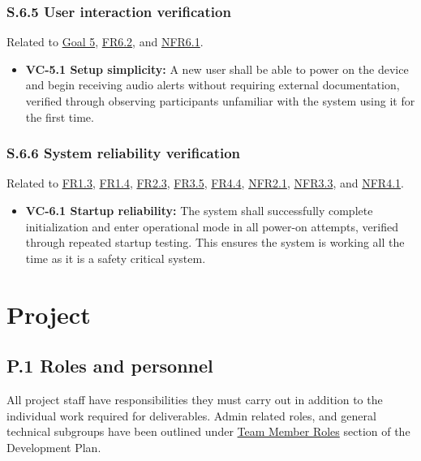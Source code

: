 \documentclass[12pt]{article}
\theoremstyle{definition}
\begin{document}
\subsubsection{S.6.5 User interaction verification}

Related to \hyperref[goal:user_friendly_interaction]{Goal 5},
\hyperref[FR6_2]{FR6.2}, and \hyperref[NFR6_1]{NFR6.1}.

\begin{itemize}
\item \textbf{VC-5.1 Setup simplicity:} A new user shall be able to power on the
device and begin receiving audio alerts without requiring external
documentation, verified through observing participants unfamiliar
with the system using it for the first time.

\end{itemize}

\subsubsection{S.6.6 System reliability verification}

Related to \hyperref[FR1_3]{FR1.3}, \hyperref[FR1_4]{FR1.4},
\hyperref[FR2_3]{FR2.3}, \hyperref[FR3_5]{FR3.5}, \hyperref[FR4_4]{FR4.4},
\hyperref[NFR2_1]{NFR2.1}, \hyperref[NFR3_3]{NFR3.3}, and
\hyperref[NFR4_1]{NFR4.1}.

\begin{itemize}
\item \textbf{VC-6.1 Startup reliability:} The system shall successfully
complete initialization and enter operational mode in all power-on
attempts, verified through repeated startup testing. This ensures the system
is working all the time as it is a safety critical system.
\end{itemize}



\section{Project}

\subsection{P.1 Roles and personnel}\label{item: p1}

All project staff have responsibilities they must carry out in addition to the 
individual work required for deliverables. Admin related roles, and general 
technical subgroups have been outlined under 
\hyperref[DevelopmentPlan-sec:TeamMemberRoles]{Team Member Roles} section of 
the Development Plan. \\
\end{document}
